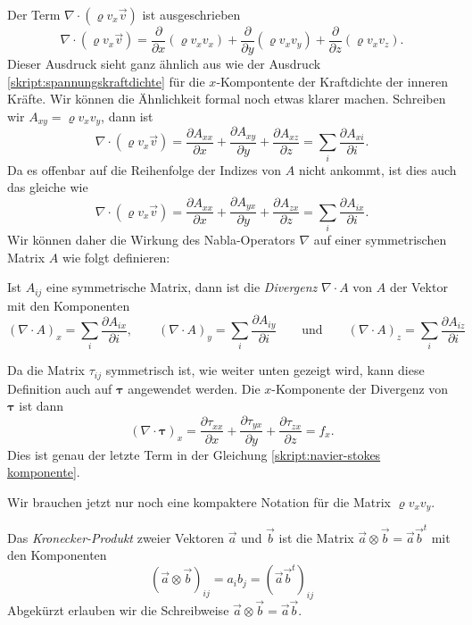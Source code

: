 Der Term $\nabla \cdot(\varrho v_x\vec{v})$ ist ausgeschrieben
\[
\nabla \cdot(\varrho v_x\vec{v})
=
\frac{\partial}{\partial x}
(\varrho v_xv_x)
+
\frac{\partial}{\partial y}
(\varrho v_xv_y)
+
\frac{\partial}{\partial z}
(\varrho v_xv_z).
\]
Dieser Ausdruck sieht ganz ähnlich aus wie der Ausdruck
\eqref{skript:spannungskraftdichte}
für die $x$-Kompontente der Kraftdichte der inneren Kräfte.
Wir können die Ähnlichkeit formal noch etwas klarer machen.
Schreiben wir $A_{xy} = \varrho v_xv_y$, dann ist
\[
\nabla \cdot(\varrho v_x\vec{v})
=
\frac{\partial A_{xx}}{\partial x}
+
\frac{\partial A_{xy}}{\partial y}
+
\frac{\partial A_{xz}}{\partial z}
=
\sum_{i}\frac{\partial A_{xi}}{\partial i}.
\]
Da es offenbar auf die Reihenfolge der Indizes von $A$ nicht ankommt,
ist dies auch das gleiche wie
\[
\nabla \cdot(\varrho v_x\vec{v})
=
\frac{\partial A_{xx}}{\partial x}
+
\frac{\partial A_{yx}}{\partial y}
+
\frac{\partial A_{zx}}{\partial z}
=
\sum_{i}\frac{\partial A_{ix}}{\partial i}.
\]
Wir können daher die Wirkung des Nabla-Operators $\nabla$ auf einer
symmetrischen Matrix $A$ wie folgt definieren:

\begin{definition}
\label{skript:definition divergenz}
Ist $A_{ij}$ eine symmetrische Matrix, dann ist die {\em Divergenz}
$\nabla\cdot A$
von
$A$ der Vektor mit den Komponenten
\[
(\nabla\cdot A)_x
=
\sum_{i}\frac{\partial A_{ix}}{\partial i},
\qquad
(\nabla\cdot A)_y
=
\sum_{i}\frac{\partial A_{iy}}{\partial i}
\qquad\text{und}\qquad
(\nabla\cdot A)_z
=
\sum_{i}\frac{\partial A_{iz}}{\partial i}
\]
\end{definition}
Da die Matrix $\tau_{ij}$ symmetrisch ist, wie weiter unten gezeigt wird,
kann diese Definition auch auf $\bm{\tau}$ angewendet werden.
Die $x$-Komponente der Divergenz von $\bm{\tau}$ ist dann
\[
(\nabla\cdot \bm{\tau})_x
=
\frac{\partial \tau_{xx}}{\partial x}
+
\frac{\partial \tau_{yx}}{\partial y}
+
\frac{\partial \tau_{zx}}{\partial z}
=
f_x.
\]
Dies ist genau der letzte Term in der Gleichung
\eqref{skript:navier-stokes komponente}.

Wir brauchen jetzt nur noch eine kompaktere Notation für die Matrix
$\varrho v_xv_y$.

\begin{definition}
Das {\em Kronecker-Produkt} zweier Vektoren $\vec{a}$ und $\vec{b}$ ist die
Matrix $\vec{a}\otimes\vec{b}=\vec{a}\vec{b}^t$ mit den Komponenten
\[
(\vec{a}\otimes\vec{b})_{ij}
=
a_ib_j
=
(
\vec{a}
\vec{b}^t
)_{ij}
\]
Abgekürzt erlauben wir die Schreibweise $\vec{a}\otimes\vec{b}=\vec{a}\vec{b}$.
\end{definition}

